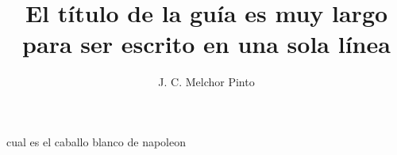 \documentclass[addpoints]{guia}
\title{El título de la guía es muy largo para ser escrito en una sola línea}
\author{J. C. Melchor Pinto}
\begin{document}
\thispagestyle{plain}
\addpoints
\INFO


\begin{questions}
    \question cual es el caballo blanco de napoleon
\end{questions}

\vfill
\puntuacion
\end{document}
